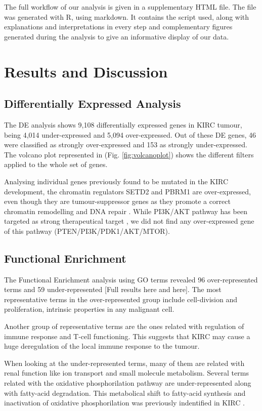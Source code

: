 \documentclass[9pt,twocolumn,twoside]{gsajnl}
\begin{document}
The full workflow of our analysis is given in a supplementary HTML file. The file was generated with R, using markdown. It contains the script used, along with explanations and interpretations in every step and complementary figures generated during the analysis to give an informative display of our data.  


\section*{Results and Discussion}
\subsection*{Differentially Expressed Analysis}
The DE analysis shows 9,108 differentially expressed genes in KIRC tumour, being 4,014 under-expressed and 5,094 over-expressed. Out of these DE genes, 46 were classified as strongly over-expressed and 153 as strongly under-expressed. The volcano plot represented in (Fig. \ref{fig:volcanoplot}) shows the different filters applied to the whole set of genes.

Analysing individual genes previously found to be mutated in the KIRC development, the chromatin regulators SETD2 and PBRM1 are over-expressed, even though they are tumour-suppressor genes as they promote a correct chromatin remodelling and DNA repair \citep{Creighton2013, Kanu2015}. While PI3K/AKT pathway has been targeted as strong therapeutical target \citep{Creighton2013}, we did not find any over-expressed gene of this pathway (PTEN/PI3K/PDK1/AKT/MTOR).

\subsection*{Functional Enrichment}
The Functional Enrichment analysis using GO terms revealed 96 over-represented terms and 59 under-represented [Full results here and here]. The most representative terms in the over-represented group include cell-division and proliferation, intrinsic properties in any malignant cell. 

Another group of representative terms are the ones related with regulation of immune response and T-cell functioning. This suggests that KIRC may cause a huge deregulation of the local immune response to the tumour. 

When looking at the under-represented terms, many of them are related with renal function like ion transport and small molecule metabolism. Several terms related with the oxidative phosphorilation pathway are under-represented along with fatty-acid degradation. This metabolical shift to fatty-acid synthesis and inactivation of oxidative phosphorilation was previously indentified in KIRC \citep{Creighton2013}.
\end{document}
